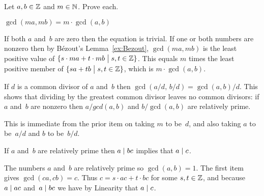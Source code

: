 \documentclass{ibl}  %
\begin{document}
\begin{bezoutproof}
\begin{problem}  \label{ex:EuclidsLemma}
Let $a,b\in\mathbb{Z}$ and $m\in\mathbb{N}$. 
Prove each.
\begin{exes}
\begin{exercise} 
  $\gcd(ma,mb)=m\cdot\gcd(a,b)$
\end{exercise}
\begin{answer}
  If both $a$ and~$b$ are zero then the equation is trivial.
  If one or both numbers are nonzero then by 
  B\'ezout's Lemma~\ref{ex:Bezout}, $\gcd(ma,mb)$ is the least
  positive value of $\{s\cdot ma+t\cdot mb \bigm| s,t\in\mathbb{Z}\}$.
  This equals $m$ times the least positive member of 
  $\{sa+tb \bigm| s,t\in\mathbb{Z}\}$, 
  which is $m\cdot\gcd(a,b)$.  
\end{answer}
\begin{exercise} 
  If $d$ is a common divisor of $a$ and~$b$ then 
  $\gcd(a/d,\,b/d)=\gcd(a,b)/d$.
  This shows that 
  dividing by the greatest common divisor leaves no common divisors:
  if $a$ and~$b$ are nonzero then $a/gcd(a,b)$ and $b/\gcd(a,b)$
  are relatively prime.
\end{exercise}
\begin{answer}
  This is immediate from the prior item on taking $m$ to be~$d$, 
  and also taking $a$ to be~$a/d$ and $b$ to be~$b/d$.       
\end{answer}
\begin{exercise}   
  If $a$ and~$b$ are relatively prime then $a\mid bc$ implies that 
  $a\mid c$.
\end{exercise}
\begin{answer}
  The numbers $a$ and~$b$ are relatively prime so $\gcd(a,b)=1$.
  The first item gives $\gcd(ca,cb)=c$.
  Thus $c=s\cdot ac+t\cdot bc$ for some $s,t\in\mathbb{Z}$, and
  because $a\mid ac$ and~$a\mid bc$ we have by Linearity that
  $a\mid c$.
\end{answer}
\end{exes}

\end{problem}
\end{bezoutproof}
\end{document}
